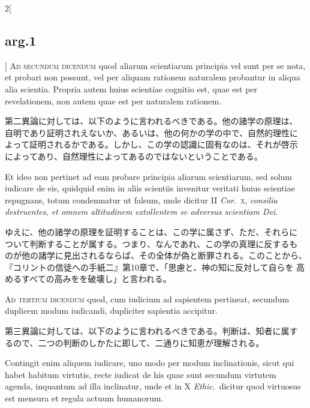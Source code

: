 \documentclass[
paper=a4paper,
fontsize=10pt,
jafontsize=9pt,
titlepage
]{jlreq}
\begin{document}
\begin{paracol}{2}[\subsection{arg.1}]
{\scshape Ad secundum dicendum} quod aliarum scientiarum principia vel
sunt per se nota, et probari non possunt, vel per aliquam rationem
naturalem probantur in aliqua alia scientia. Propria autem huius
scientiae cognitio est, quae est per revelationem, non autem quae est
per naturalem rationem.

\switchcolumn

第二異論に対しては、以下のように言われるべきである。他の諸学の原理は、
自明であり証明されえないか、あるいは、他の何かの学の中で、自然的理性に
よって証明されるかである。しかし、この学の認識に固有なのは、それが啓示
によってあり、自然理性によってあるのではないということである。

\switchcolumn*

Et ideo non pertinet ad eam probare principia aliarum scientiarum, sed
solum iudicare de eis, quidquid enim in aliis scientiis invenitur
veritati huius scientiae repugnans, totum condemnatur ut falsum, unde
dicitur II {\itshape Cor}.~{\scshape x}, {\itshape consilia
destruentes, et omnem altitudinem extollentem se adversus scientiam
Dei}.

\switchcolumn

ゆえに、他の諸学の原理を証明することは、この学に属さず、ただ、それらに
ついて判断することが属する。つまり、なんであれ、この学の真理に反するも
のが他の諸学に見出されるならば、その全体が偽と断罪される。このことから、
『コリントの信徒への手紙二』第10章で、「思慮と、神の知に反対して自らを
高めるすべての高みをを破壊し」と言われる。

\switchcolumn*[\subsection{ad.3}]

{\scshape Ad tertium dicendum} quod, cum iudicium ad sapientem
pertineat, secundum duplicem modum iudicandi, dupliciter sapientia
accipitur.

\switchcolumn

第三異論に対しては、以下のように言われるべきである。判断は、知者に属す
るので、二つの判断のしかたに即して、二通りに知恵が理解される。

\switchcolumn*

Contingit enim aliquem iudicare, uno modo per modum inclinationis,
sicut qui habet habitum virtutis, recte iudicat de his quae sunt
secundum virtutem agenda, inquantum ad illa inclinatur, unde et in X
{\itshape Ethic}.~dicitur quod virtuosus est mensura et regula actuum
humanorum.


\end{paracol}
\end{document}
